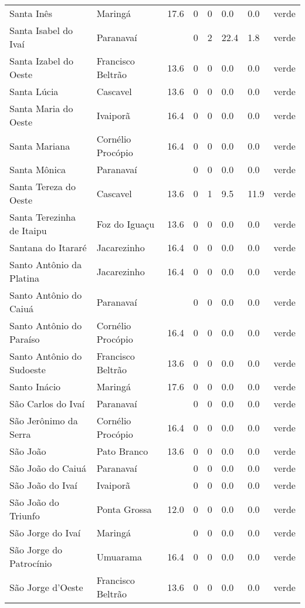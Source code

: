 \begin{longtable}{l|lllllll}
  Santa Inês & Maringá & 17.6 & 0 & 0 & 0.0 & 0.0 & verde \\ 
  Santa Isabel do Ivaí & Paranavaí &  & 0 & 2 & 22.4 & 1.8 & verde \\ 
  Santa Izabel do Oeste & Francisco Beltrão & 13.6 & 0 & 0 & 0.0 & 0.0 & verde \\ 
  Santa Lúcia & Cascavel & 13.6 & 0 & 0 & 0.0 & 0.0 & verde \\ 
  Santa Maria do Oeste & Ivaiporã & 16.4 & 0 & 0 & 0.0 & 0.0 & verde \\ 
  Santa Mariana & Cornélio Procópio & 16.4 & 0 & 0 & 0.0 & 0.0 & verde \\ 
  Santa Mônica & Paranavaí &  & 0 & 0 & 0.0 & 0.0 & verde \\ 
  Santa Tereza do Oeste & Cascavel & 13.6 & 0 & 1 & 9.5 & 11.9 & verde \\ 
  Santa Terezinha de Itaipu & Foz do Iguaçu & 13.6 & 0 & 0 & 0.0 & 0.0 & verde \\ 
  Santana do Itararé & Jacarezinho & 16.4 & 0 & 0 & 0.0 & 0.0 & verde \\ 
  Santo Antônio da Platina & Jacarezinho & 16.4 & 0 & 0 & 0.0 & 0.0 & verde \\ 
  Santo Antônio do Caiuá & Paranavaí &  & 0 & 0 & 0.0 & 0.0 & verde \\ 
  Santo Antônio do Paraíso & Cornélio Procópio & 16.4 & 0 & 0 & 0.0 & 0.0 & verde \\ 
  Santo Antônio do Sudoeste & Francisco Beltrão & 13.6 & 0 & 0 & 0.0 & 0.0 & verde \\ 
  Santo Inácio & Maringá & 17.6 & 0 & 0 & 0.0 & 0.0 & verde \\ 
  São Carlos do Ivaí & Paranavaí &  & 0 & 0 & 0.0 & 0.0 & verde \\ 
  São Jerônimo da Serra & Cornélio Procópio & 16.4 & 0 & 0 & 0.0 & 0.0 & verde \\ 
  São João & Pato Branco & 13.6 & 0 & 0 & 0.0 & 0.0 & verde \\ 
  São João do Caiuá & Paranavaí &  & 0 & 0 & 0.0 & 0.0 & verde \\ 
  São João do Ivaí & Ivaiporã &  & 0 & 0 & 0.0 & 0.0 & verde \\ 
  São João do Triunfo & Ponta Grossa & 12.0 & 0 & 0 & 0.0 & 0.0 & verde \\ 
  São Jorge do Ivaí & Maringá &  & 0 & 0 & 0.0 & 0.0 & verde \\ 
  São Jorge do Patrocínio & Umuarama & 16.4 & 0 & 0 & 0.0 & 0.0 & verde \\ 
  São Jorge d'Oeste & Francisco Beltrão & 13.6 & 0 & 0 & 0.0 & 0.0 & verde \\ 

\end{longtable}
